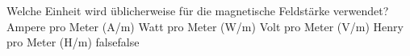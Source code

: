    {Welche Einheit wird üblicherweise für die magnetische Feldstärke verwendet?}
    {Ampere pro Meter (A/m)}
    {Watt pro Meter (W/m)}
    {Volt pro Meter (V/m)}
    {Henry pro Meter (H/m)}
    {false}{false}